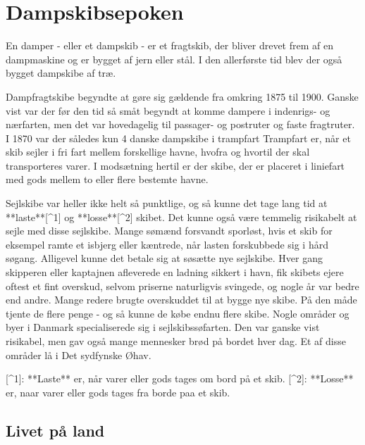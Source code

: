\documentclass{book}
\newcommand{\word}[2]{ \blue #1 #2 }
\begin{document}
\part{Dampskibsepoken}

En damper - eller et dampskib - er et fragtskib, der bliver drevet frem af en
dampmaskine og er bygget af jern eller stål. I den allerførste tid blev der også
bygget dampskibe af træ.


Dampfragtskibe begyndte at gøre sig gældende fra omkring 1875 til 1900. Ganske
vist var der før den tid så småt begyndt at komme dampere i indenrigs- og
nærfarten, men det var hovedagelig til passager- og postruter og faste
fragtruter. I 1870 var der således kun 4 danske dampskibe i
\word{trampfart}{Trampfart er, når et skib sejler i fri fart mellem forskellige
havne, hvofra og hvortil der skal transporteres varer. I modsætning hertil er
der skibe, der er placeret i liniefart med gods mellem to eller flere bestemte
havne.}


Sejlskibe var heller ikke helt så punktlige, og så kunne det tage lang tid at **laste**[^1] og
**losse**[^2] skibet.  Det kunne også være temmelig risikabelt at sejle med disse sejlskibe.
Mange sømænd forsvandt sporløst, hvis et skib for eksempel ramte et isbjerg eller
kæntrede, når lasten forskubbede sig i hård søgang. Alligevel kunne det betale sig at
søsætte nye sejlskibe. Hver gang skipperen eller kaptajnen afleverede en ladning sikkert
i havn, fik skibets ejere oftest et fint overskud, selvom priserne naturligvis svingede,
og nogle år var bedre end andre. Mange redere brugte overskuddet til at bygge nye skibe.
På den måde tjente de flere penge - og så kunne de købe endnu flere skibe. Nogle områder
og byer i Danmark specialiserede sig i sejlskibssøfarten. Den var ganske vist risikabel,
men gav også mange mennesker brød på bordet hver dag. Et af disse områder lå i Det
sydfynske Øhav.

[^1]: **Laste** er, når varer eller gods tages om bord på et skib.
[^2]: **Losse** er, naar varer eller gods tages fra borde paa et skib.


\chapter{Livet på land}
\end{document}
